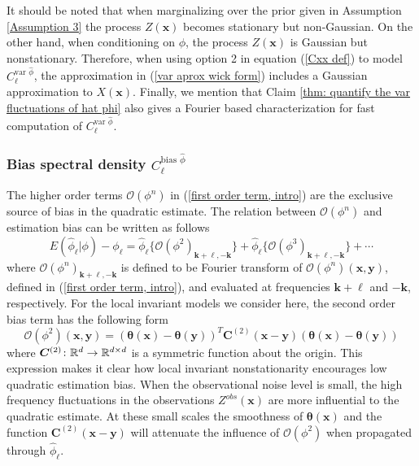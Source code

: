 \documentclass[10pt,noinfoline]{imsart}
\newcommand{\bs}{\boldsymbol}
\begin{document}
It should be noted that when marginalizing  over the prior given in Assumption \ref{Assumption 3} the process $Z(\bs x)$ becomes stationary but non-Gaussian. On the other hand, when conditioning on $\phi$, the process $Z(\bs x)$ is Gaussian but nonstationary. Therefore, when using option 2 in equation (\ref{Cxx def}) to model $C^{\text{var }\hat\phi}_{\bs \ell}$, the approximation in (\ref{var aprox wick form}) includes a Gaussian approximation to $X(\bs x)$. Finally, we mention that Claim \ref{thm: quantify the var fluctuations of hat phi} also gives a Fourier based characterization  for fast computation of $C^{\text{var }\hat\phi}_{\bs \ell}$. 









\subsubsection{Bias spectral density $C_{\bs \ell}^{\text{bias }\hat\phi}$}
\label{SubSection: bias}

The higher order terms $\mathcal O(\phi^n)$ in  (\ref{first order term, intro}) are the exclusive source of bias in the quadratic estimate. The relation between $\mathcal O(\phi^n)$ and estimation bias can be written as follows
\[
E(\hat\phi_{\bs \ell}|\phi) -\phi_{\bs \ell} =   \hat\phi_{\bs\ell}\bigl \{ {\mathcal O(\phi^2)}_{\bs k +\bs \ell, -\bs k} \bigr \} + \hat\phi_{\bs\ell}\bigl \{ {\mathcal O(\phi^3)}_{\bs k +\bs \ell, -\bs k} \bigr \} +\cdots
\]
where $\mathcal O(\phi^n)_{\bs k+\bs \ell, -\bs k}$ is defined to be Fourier transform of $\mathcal O(\phi^n)(\bs x,\bs y)$, defined in (\ref{first order term, intro}), and evaluated at frequencies $\bs k+\bs \ell$ and  $-\bs k$, respectively. For the local invariant models we consider here, the second order bias term has the following form 
\begin{equation}\label{eq: 2nd order bias (x,y)}
\mathcal O(\phi^2)(\bs x,\bs y) = (\bs\theta(\bs x) - \bs\theta(\bs y))^T \bs C^{(2)}(\bs x-\bs y) (\bs\theta(\bs x) - \bs\theta(\bs y))
\end{equation}
where $\bs C^{(2)}\colon \Bbb R^d\rightarrow \Bbb R^{d\times d}$ is a symmetric function about the origin.
This expression makes it clear how local invariant nonstationarity encourages low quadratic estimation bias. When the observational noise level is small, the high frequency fluctuations in the observations $Z^{obs}(\bs x)$ are more influential to the quadratic estimate.
At these small scales the smoothness of $\bs \theta(\bs x)$ and the function $\bs C^{(2)}(\bs x-\bs y)$ will attenuate the influence of $\mathcal O(\phi^2)$  when propagated through $\hat\phi_{\bs \ell}$.
\end{document}

